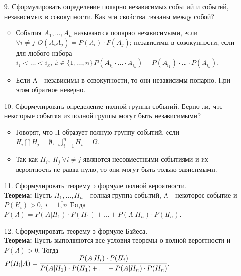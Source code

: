\documentclass[a4paper]{article}
\begin{document}
\begin{enumerate}
\item[9.] Сформулировать определение попарно независимых событий и событий, независимых в совокупности. Как эти свойства связаны между собой? \\
\begin{itemize}
\item События $A_1, \ldots, A_n$ называются попарно независимыми, если $\forall i \neq j \ \ O(A_i A_j) = P(A_i) \cdot P(A_j)$; независимы в совокупности, если для любого набора $i_1 < \ldots < i_k, \ k \in \{1, \ldots, n\} \ P(A_{i_1} \cdot \ldots \cdot A_{i_k}) = P(A_{i_1}) \cdot \ldots \cdot P(A_{i_k})$.
\item Если A - независимы в совокупности, то они независимы попарно. При этом обратное неверно.
\end{itemize}



\item[10.] Сформулировать определение полной группы событий. Верно ли, что некоторые события из полной группы могут быть независимыми? \\
\begin{itemize}
\item Говорят, что H образует полную группу событий, если $H_i \bigcap H_j = \emptyset, \ \bigcup\limits_{i = 1}^{n} H_i = \Omega$.
\item Так как $H_i, \ H_j \ \forall i \neq j$ являются несовместными событиями и их вероятность не равна нулю, то они могут быть только зависимыми.
\end{itemize}



\item[11.] Сформулировать теорему о формуле полной вероятности. \\
\textbf{Теорема:} Пусть $H_1, \ldots, H_n$ - полная группа событий, A - некоторое событие и $P(H_i) > 0, \ i = \overline{1,n}$ Тогда $P(A) = P(A|H_1) \cdot P(H_1) + \ldots + P(A|H_n) \cdot P(H_n)$.



\item[12.] Сформулировать теорему о формуле Байеса. \\
\textbf{Теорема:} Пусть выполняются все условия теоремы о полной вероятности и $P(A) > 0$. Тогда \\ 
$P(H_i|A) = \cfrac{P(A|H_i) \cdot P(H_i)}{P(A|H_1) \cdot P(H_1) + \ldots + P(A|H_n) \cdot P(H_n)}$.




\end{enumerate}
\end{document}

